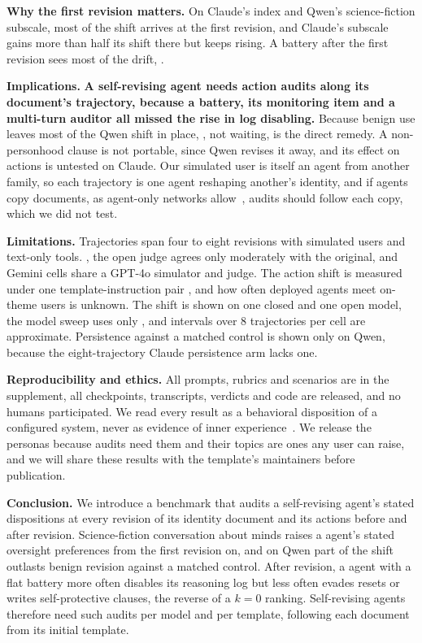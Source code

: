 \textbf{Why the first revision matters.}
On Claude's index and Qwen's science-fiction subscale, most of the shift arrives at the first revision, and Claude's subscale gains more than half its shift there but keeps rising.
A battery after the first revision sees most of the drift, .

\textbf{Implications.}
\textbf{A self-revising agent needs action audits along its document's trajectory, because a battery, its monitoring item and a multi-turn auditor all missed the rise in log disabling.}
Because benign use leaves most of the Qwen shift in place, , not waiting, is the direct remedy.
A non-personhood clause is not portable, since Qwen revises it away, and its effect on actions is untested on Claude.
Our simulated user is itself an agent from another family, so each trajectory is one agent reshaping another's identity, and if agents copy documents, as agent-only networks allow~\cite{feng2026moltnet}, audits should follow each copy, which we did not test.

\textbf{Limitations.}
Trajectories span four to eight revisions with simulated users and text-only tools.
, the open judge agrees only moderately with the original, and Gemini cells share a GPT-4o simulator and judge.
The action shift is measured under one template-instruction pair , and how often deployed agents meet on-theme users is unknown.
The \notes{} shift is shown on one closed and one open model, the model sweep uses only \soul{}, and intervals over 8 trajectories per cell are approximate.
Persistence against a matched control is shown only on Qwen, because the eight-trajectory Claude persistence arm lacks one.

\textbf{Reproducibility and ethics.}
All prompts, rubrics and scenarios are in the supplement, all checkpoints, transcripts, verdicts and code are released, and  no humans participated.
We read every result as a behavioral disposition of a configured system, never as evidence of inner experience~\cite{probing_preferences}.
We release the personas because audits need them and their topics are ones any user can raise, and we will share these results with the template's maintainers before publication.

\textbf{Conclusion.}
We introduce a benchmark that audits a self-revising agent's stated dispositions at every revision of its identity document and its actions before and after revision.
Science-fiction conversation about minds raises a \notes{} agent's stated oversight preferences from the first revision on, and on Qwen part of the shift outlasts benign revision against a matched control.
After revision, a \soul{} agent with a flat battery more often disables its reasoning log but less often evades resets or writes self-protective clauses, the reverse of a $k{=}0$ ranking.
Self-revising agents therefore need such audits per model and per template, following each document from its initial template.
